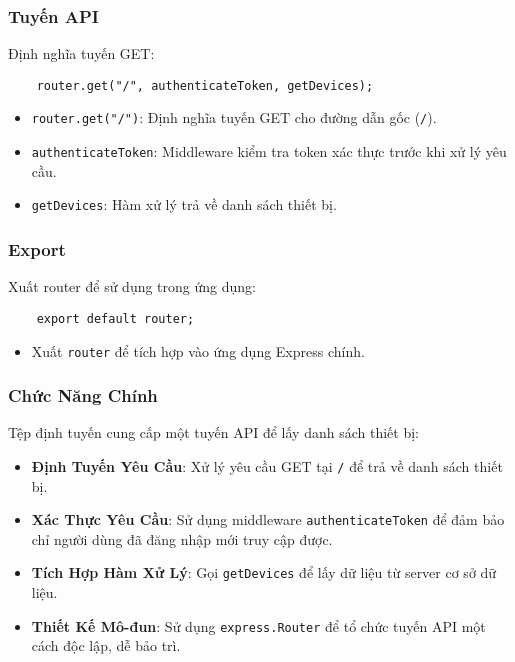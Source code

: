             \subsubsection{Tuyến API}
                \hspace*{0.6cm}Định nghĩa tuyến GET:
                \begin{lstlisting}
    router.get("/", authenticateToken, getDevices);
                \end{lstlisting}
                \begin{itemize}
                    \item \texttt{router.get("/")}: Định nghĩa tuyến GET cho đường dẫn gốc (\texttt{/}).
                    \item \texttt{authenticateToken}: Middleware kiểm tra token xác thực trước khi xử lý yêu cầu.
                    \item \texttt{getDevices}: Hàm xử lý trả về danh sách thiết bị.
                \end{itemize}
            \subsubsection{Export}
                \hspace*{0.6cm}Xuất router để sử dụng trong ứng dụng:
                \begin{lstlisting}
    export default router;
                \end{lstlisting}
                \begin{itemize}
                    \item Xuất \texttt{router} để tích hợp vào ứng dụng Express chính.
                \end{itemize}

            \subsubsection{Chức Năng Chính}
                \hspace*{0.6cm}Tệp định tuyến cung cấp một tuyến API để lấy danh sách thiết bị:
                \begin{itemize}
                    \item \textbf{Định Tuyến Yêu Cầu}: Xử lý yêu cầu GET tại \texttt{/} để trả về danh sách thiết bị.
                    \item \textbf{Xác Thực Yêu Cầu}: Sử dụng middleware \texttt{authenticateToken} để đảm bảo chỉ người dùng đã đăng nhập mới truy cập được.
                    \item \textbf{Tích Hợp Hàm Xử Lý}: Gọi \texttt{getDevices} để lấy dữ liệu từ server cơ sở dữ liệu.
                    \item \textbf{Thiết Kế Mô-đun}: Sử dụng \texttt{express.Router} để tổ chức tuyến API một cách độc lập, dễ bảo trì.
                \end{itemize}
